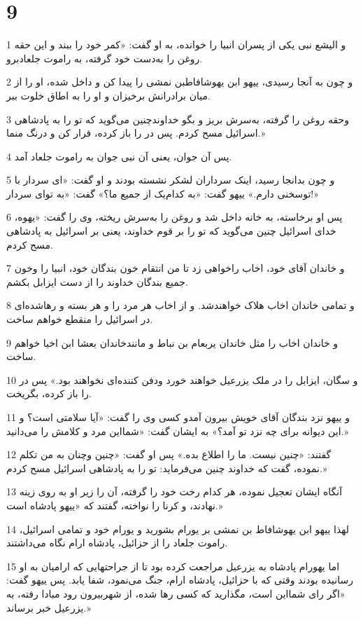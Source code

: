 \chapter{9}

\par 1 و الیشع نبی یکی از پسران انبیا را خوانده، به او گفت: «کمر خود را ببند و این حقه روغن را به‌دست خود گرفته، به راموت جلعادبرو.
\par 2 و چون به آنجا رسیدی، ییهو ابن یهوشافاطبن نمشی را پیدا کن و داخل شده، او را از میان برادرانش برخیزان و او را به اطاق خلوت ببر.
\par 3 وحقه روغن را گرفته، به‌سرش بریز و بگو خداوندچنین می‌گوید که تو را به پادشاهی اسرائیل مسح کردم. پس در را باز کرده، فرار کن و درنگ منما.»
\par 4 پس آن جوان، یعنی آن نبی جوان به راموت جلعاد آمد.
\par 5 و چون بدانجا رسید، اینک سرداران لشکر نشسته بودند و او گفت: «ای سردار با توسخنی دارم.» ییهو گفت: «به کدام‌یک از جمیع ما؟» گفت: «به تو‌ای سردار!»
\par 6 پس او برخاسته، به خانه داخل شد و روغن را به‌سرش ریخته، وی را گفت: «یهوه، خدای اسرائیل چنین می‌گوید که تو را بر قوم خداوند، یعنی بر اسرائیل به پادشاهی مسح کردم.
\par 7 و خاندان آقای خود، اخاب راخواهی زد تا من انتقام خون بندگان خود، انبیا را وخون جمیع بندگان خداوند را از دست ایزابل بکشم.
\par 8 و تمامی خاندان اخاب هلاک خواهندشد. و از اخاب هر مرد را و هر بسته و رهاشده‌ای در اسرائیل را منقطع خواهم ساخت.
\par 9 و خاندان اخاب را مثل خاندان یربعام بن نباط و مانندخاندان بعشا ابن اخیا خواهم ساخت.
\par 10 و سگان، ایزابل را در ملک یزرعیل خواهند خورد ودفن کننده‌ای نخواهند بود.» پس در را باز کرده، بگریخت.
\par 11 و ییهو نزد بندگان آقای خویش بیرون آمدو کسی وی را گفت: «آیا سلامتی است؟ و این دیوانه برای چه نزد تو آمد؟» به ایشان گفت: «شمااین مرد و کلامش را می‌دانید.»
\par 12 گفتند: «چنین نیست. ما را اطلاع بده.» پس او گفت: «چنین وچنان به من تکلم نموده، گفت که خداوند چنین می‌فرماید: تو را به پادشاهی اسرائیل مسح کردم.»
\par 13 آنگاه ایشان تعجیل نموده، هر کدام رخت خود را گرفته، آن را زیر او به روی زینه نهادند، و کرنا را نواخته، گفتند که «ییهو پادشاه است.»
\par 14 لهذا ییهو ابن یهوشافاط بن نمشی بر یورام بشورید و یورام خود و تمامی اسرائیل، راموت جلعاد را از حزائیل، پادشاه ارام نگاه می‌داشتند.
\par 15 اما یهورام پادشاه به یزرعیل مراجعت کرده بود تا از جراحتهایی که ارامیان به او رسانیده بودند وقتی که با حزائیل، پادشاه ارام، جنگ می‌نمود، شفا یابد. پس ییهو گفت: «اگر رای شمااین است، مگذارید که کسی رها شده، از شهربیرون رود مبادا رفته، به یزرعیل خبر برساند.»

